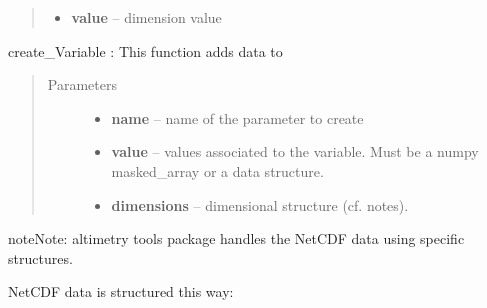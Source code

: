 \documentclass[letterpaper,10pt,english]{sphinxmanual}
\begin{document}
\begin{fulllineitems}
\begin{fulllineitems}
\begin{quote}
\begin{description}
\begin{itemize}
\item {} 
\textbf{value} -- dimension value

\end{itemize}

\end{description}\end{quote}

\end{fulllineitems}


\begin{fulllineitems}
\label{altimetry.data:altimetry.data.hydro_data.create_Variable}
create\_Variable : This function adds data to {\hyperref[altimetry.data:altimetry.data.hydro_data]{}}
\begin{quote}\begin{description}
\item[{Parameters}] \leavevmode\begin{itemize}
\item {} 
\textbf{name} -- name of the parameter to create

\item {} 
\textbf{value} -- values associated to the variable. Must be a numpy masked\_array or a data structure.

\item {} 
\textbf{dimensions} -- dimensional structure (cf. notes).

\end{itemize}

\end{description}\end{quote}
\label{altimetry.data:structures}
\begin{notice}{note}{Note:}
altimetry tools package handles the NetCDF data using specific structures.

NetCDF data is structured this way:


\end{notice}
\end{fulllineitems}
\end{fulllineitems}
\end{document}

